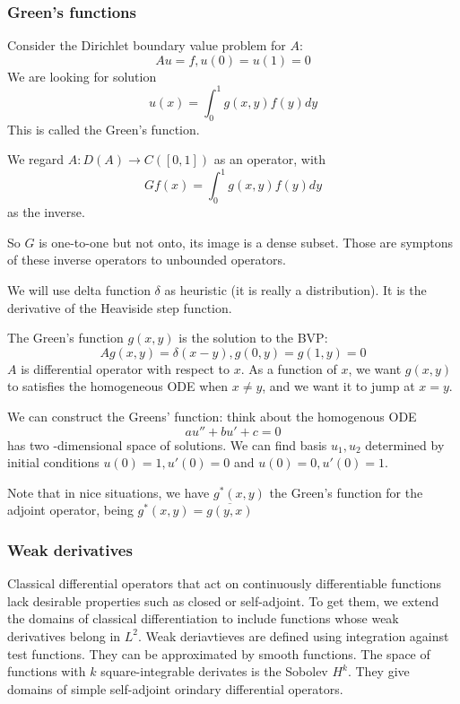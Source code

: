 \documentclass[main.tex]{subfiles}
\begin{document}
\subsubsection{Green's functions}
Consider the Dirichlet boundary value problem for $A$:
$$
Au = f, u(0) = u(1) = 0
$$
We are looking for solution 
$$
u(x) = \int_0 ^1 g(x,y) f(y) dy
$$
This is called the Green's function. 

We regard $A : D(A) \rightarrow C([0,1])$ as an operator, with 
$$
Gf(x) = \int_0 ^1 g(x,y)f(y) dy
$$
as the inverse.

\begin{remark}
So $G$ is one-to-one but not onto, its image is a dense subset. Those are symptons of these inverse operators to unbounded operators.
\end{remark}

We will use delta function $\delta$ as heuristic (it is really a distribution). It is the derivative of the Heaviside step function.

The Green's function $g(x,y)$ is the solution to the BVP:
$$
Ag(x,y) = \delta(x-y), g(0,y) = g(1,y) = 0
$$
$A$ is differential operator with respect to $x$. As a function of $x$, we want $g(x,y)$ to satisfies the homogeneous ODE when $x \neq y$, and we want it to jump at $x = y$. 

We can construct the Greens' function: think about the homogenous ODE 
$$
au'' + bu' + c = 0
$$
has two -dimensional space of solutions. We can find basis $u_1, u_2$ determined by initial conditions $u(0) = 1, u'(0) = 0$ and $u(0) = 0, u'(0) = 1$. 

Note that in nice situations, we have $g^*(x,y)$ the Green's function for the adjoint operator, being $g^*(x,y) = \overline{g(y,x)}$

\subsubsection{Weak derivatives}
Classical differential operators that act on continuously differentiable functions lack desirable properties such as closed or self-adjoint. To get them, we extend the domains of classical differentiation to include functions whose weak derivatives belong in $L^2$. Weak deriavtieves are defined using integration against test functions. They can be approximated by smooth functions. The space of functions with $k$ square-integrable derivates is the Sobolev $H^k$. They give domains of simple self-adjoint orindary differential operators.
\end{document}
